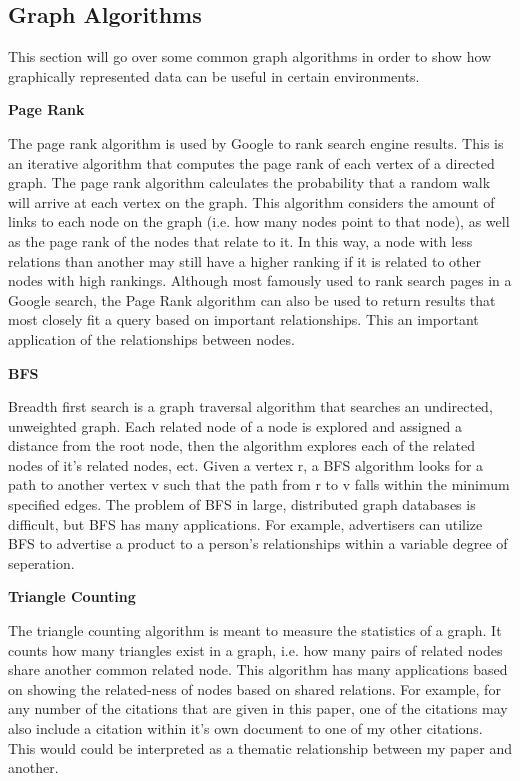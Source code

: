 \subsection*{Graph Algorithms}

This section will go over some common graph algorithms in order to show how graphically represented data can be useful in certain environments.

\textbf{Page Rank}
\par
The page rank algorithm is used by Google to rank search engine results. This is an iterative algorithm that computes the page rank of each vertex of a directed graph.
The page rank algorithm calculates the probability that a random walk will arrive at each vertex on the graph. 
This algorithm considers the amount of links to each node on the graph (i.e. how many nodes point to that node), as well as the page rank of the nodes that relate to it\cite{google}. In this way, a node with less relations than another may still have a higher ranking if it is related to other nodes with high rankings.
Although most famously used to rank search pages in a Google search, the Page Rank algorithm can also be used to return results that most closely fit a query based on important relationships. This an important application of the relationships between nodes.
\par
\textbf{BFS}
\par
Breadth first search is a graph traversal algorithm that searches an undirected, unweighted graph. Each related node of a node is explored and assigned a distance from the root node, then the algorithm explores each of the related nodes of it's related nodes, ect.
Given a vertex r, a BFS algorithm looks for a path to another vertex v such that the path from r to v falls within the minimum specified edges\cite{BFS}.
The problem of BFS in large, distributed graph databases is difficult, but BFS has many applications. For example, advertisers can utilize BFS to advertise a product to a person's relationships within a variable degree of seperation.
\par
\textbf{Triangle Counting}
\par
The triangle counting algorithm is meant to measure the statistics of a graph. It counts how many triangles exist in a graph, i.e. how many pairs of related nodes share another common related node\cite{triangles}. 
This algorithm has many applications based on showing the related-ness of nodes based on shared relations. 
For example, for any number of the citations that are given in this paper, one of the citations may also include a citation within it's own document to one of my other citations. This would could be interpreted as a thematic relationship between my paper and another.
